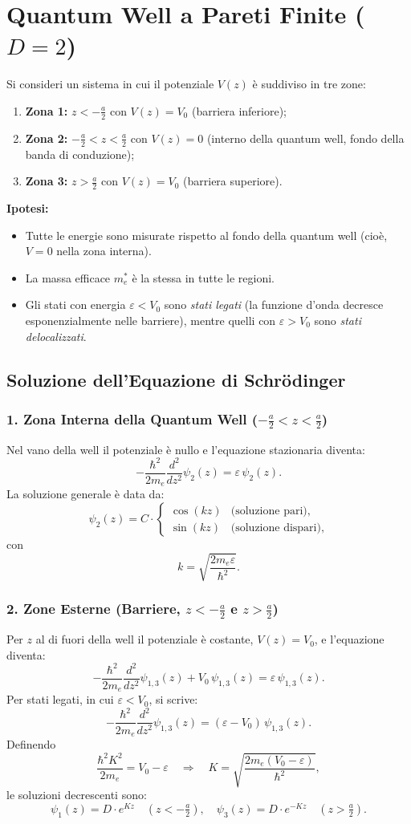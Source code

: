 \section*{Quantum Well a Pareti Finite ($D=2$)}
Si consideri un sistema in cui il potenziale $V(z)$ è suddiviso in tre zone:
\begin{enumerate}
    \item \textbf{Zona 1:} $z < -\frac{a}{2}$ con $V(z) = V_0$ (barriera inferiore);
    \item \textbf{Zona 2:} $-\frac{a}{2} < z < \frac{a}{2}$ con $V(z)=0$ (interno della quantum well, fondo della banda di conduzione);
    \item \textbf{Zona 3:} $z > \frac{a}{2}$ con $V(z) = V_0$ (barriera superiore).
\end{enumerate}
\textbf{Ipotesi:}
\begin{itemize}
    \item Tutte le energie sono misurate rispetto al fondo della quantum well (cioè, $V=0$ nella zona interna).
    \item La massa efficace $m_e^*$ è la stessa in tutte le regioni.
    \item Gli stati con energia $\varepsilon<V_0$ sono \emph{stati legati} (la funzione d'onda decresce esponenzialmente nelle barriere), mentre quelli con $\varepsilon > V_0$ sono \emph{stati delocalizzati}.
\end{itemize}
\subsection*{Soluzione dell'Equazione di Schrödinger}
\subsubsection*{1. Zona Interna della Quantum Well ($-\frac{a}{2} < z < \frac{a}{2}$)}
Nel vano della well il potenziale è nullo e l'equazione stazionaria diventa:
\[
-\frac{\hbar^2}{2m_e}\frac{d^2}{dz^2}\psi_2(z) = \varepsilon\, \psi_2(z).
\]
La soluzione generale è data da:
\[
\psi_2(z)= C\cdot
\begin{cases}
\cos(kz) & \text{(soluzione pari)},\\[1mm]
\sin(kz) & \text{(soluzione dispari)},
\end{cases}
\]
con
\[
k=\sqrt{\frac{2m_e\varepsilon}{\hbar^2}}.
\]

\subsubsection*{2. Zone Esterne (Barriere, $z < -\frac{a}{2}$ e $z > \frac{a}{2}$)}
Per $z$ al di fuori della well il potenziale è costante, $V(z)=V_0$, e l'equazione diventa:
\[
-\frac{\hbar^2}{2m_e}\frac{d^2}{dz^2}\psi_{1,3}(z) + V_0\,\psi_{1,3}(z)= \varepsilon\,\psi_{1,3}(z).
\]
Per stati legati, in cui $\varepsilon<V_0$, si scrive:
\[
-\frac{\hbar^2}{2m_e}\frac{d^2}{dz^2}\psi_{1,3}(z) = (\varepsilon-V_0)\, \psi_{1,3}(z).
\]
Definendo
\[
\frac{\hbar^2K^2}{2m_e} = V_0-\varepsilon \quad \Longrightarrow \quad K=\sqrt{\frac{2m_e(V_0-\varepsilon)}{\hbar^2}},
\]
le soluzioni decrescenti sono:
\[
\psi_1(z)= D\cdot e^{Kz} \quad (z< -\tfrac{a}{2}), \quad \psi_3(z)= D\cdot e^{-Kz}\quad (z>\tfrac{a}{2}).
\]


